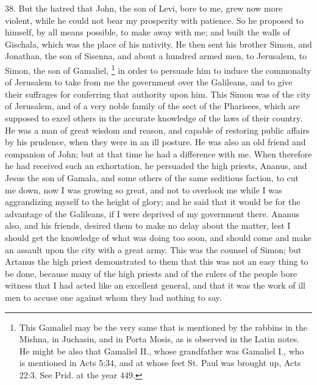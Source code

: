 38. But the hatred that John, the son of Levi, bore to me, grew now more
violent, while he could not bear my prosperity with patience. So he
proposed to himself, by all means possible, to make away with me; and
built the walls of Gischala, which was the place of his nativity. He then
sent his brother Simon, and Jonathan, the son of Sisenna, and about a
hundred armed men, to Jerusalem, to Simon, the son of Gamaliel, \footnote{This Gamaliel may be the
very same that is mentioned by the rabbins in the Mishna, in Juchasin, and
in Porta Mosis, as is observed in the Latin notes. He might be also that
Gamaliel II., whose grandfather was Gamaliel I., who is mentioned in Acts
5:34, and at whose feet St. Paul was brought up, Acts 22:3. See Prid. at
the year 449.}
in order to persuade him to induce the commonalty of Jerusalem to take
from me the government over the Galileans, and to give their suffrages for
conferring that authority upon him. This Simon was of the city of
Jerusalem, and of a very noble family of the sect of the Pharisees, which
are supposed to excel others in the accurate knowledge of the laws of
their country. He was a man of great wisdom and reason, and capable of
restoring public affairs by his prudence, when they were in an ill
posture. He was also an old friend and companion of John; but at that time
he had a difference with me. When therefore he had received such an
exhortation, he persuaded the high priests, Ananus, and Jesus the son of
Gamala, and some others of the same seditious faction, to cut me down, now
I was growing so great, and not to overlook me while I was aggrandizing
myself to the height of glory; and he said that it would be for the
advantage of the Galileans, if I were deprived of my government there.
Ananus also, and his friends, desired them to make no delay about the
matter, lest I should get the knowledge of what was doing too soon, and
should come and make an assault upon the city with a great army. This was
the counsel of Simon; but Artanus the high priest demonstrated to them
that this was not an easy thing to be done, because many of the high
priests and of the rulers of the people bore witness that I had acted like
an excellent general, and that it was the work of ill men to accuse one
against whom they had nothing to say.

